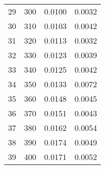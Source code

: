 \begin{table}[H]
\begin{tabular}{cccc}
\cline{1-4}
29 & 300 & 0.0100 & 0.0032 \\
\cline{1-4}
30 & 310 & 0.0103 & 0.0042 \\
\cline{1-4}
31 & 320 & 0.0113 & 0.0032 \\
\cline{1-4}
32 & 330 & 0.0123 & 0.0039 \\
\cline{1-4}
33 & 340 & 0.0125 & 0.0042 \\
\cline{1-4}
34 & 350 & 0.0133 & 0.0072 \\
\cline{1-4}
35 & 360 & 0.0148 & 0.0045 \\
\cline{1-4}
36 & 370 & 0.0151 & 0.0043 \\
\cline{1-4}
37 & 380 & 0.0162 & 0.0054 \\
\cline{1-4}
38 & 390 & 0.0174 & 0.0049 \\
\cline{1-4}
39 & 400 & 0.0171 & 0.0052 \\
\cline{1-4}
\end{tabular}
\end{table}

